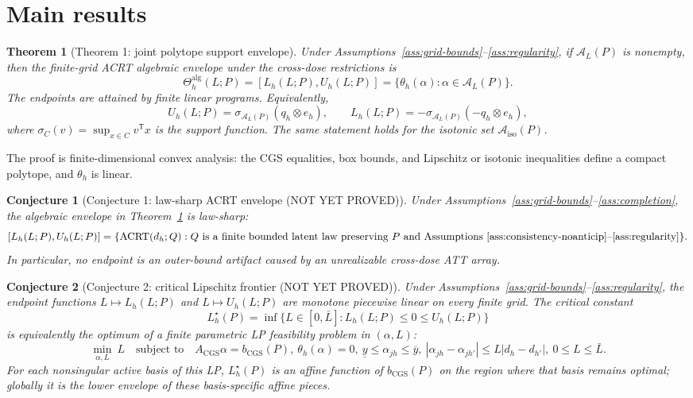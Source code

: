 \documentclass[11pt]{article}
\newcommand{\transpose}{\mathsf{T}}
\theoremstyle{definition}
\theoremstyle{plain}
\newtheorem{theorem}{Theorem}
\newtheorem{conjecture}{Conjecture}
\theoremstyle{remark}
\begin{document}
\section{Main results}
\begin{theorem}[Theorem 1: joint polytope support envelope]\label{thm:joint-envelope}
Under Assumptions~\ref{ass:grid-bounds}--\ref{ass:regularity}, if
\(\mathcal A_L(P)\) is nonempty, then the finite-grid ACRT algebraic envelope
under the cross-dose restrictions is
\[
  \Theta_h^{\mathrm{alg}}(L;P)=
  [L_h(L;P),U_h(L;P)]
  =
  \{\theta_h(\alpha):\alpha\in\mathcal A_L(P)\}.
\]
The endpoints are attained by finite linear programs.  Equivalently,
\[
  U_h(L;P)=\sigma_{\mathcal A_L(P)}(q_h\otimes e_h),
  \qquad
  L_h(L;P)=-\sigma_{\mathcal A_L(P)}(-q_h\otimes e_h),
\]
where \(\sigma_C(v)=\sup_{x\in C}v^\transpose x\) is the support function.
The same statement holds for the isotonic set
\(\mathcal A_{\mathrm{iso}}(P)\).
\end{theorem}
The proof is finite-dimensional convex analysis: the CGS equalities, box
bounds, and Lipschitz or isotonic inequalities define a compact polytope, and
\(\theta_h\) is linear.

\begin{conjecture}[Conjecture 1: law-sharp ACRT envelope (NOT YET PROVED)]\label{conj:law-sharp}
Under Assumptions~\ref{ass:grid-bounds}--\ref{ass:completion}, the algebraic
envelope in Theorem~\ref{thm:joint-envelope} is law-sharp:
\[
  [L_h(L;P),U_h(L;P)]
  =
  \{\operatorname{ACRT}(d_h;Q):Q \text{ is a finite bounded latent law
  preserving } P \text{ and Assumptions } \ref{ass:consistency-noanticip}
  \text{--}\ref{ass:regularity}\}.
\]
In particular, no endpoint is an outer-bound artifact caused by an
unrealizable cross-dose ATT array.
\end{conjecture}

\begin{conjecture}[Conjecture 2: critical Lipschitz frontier (NOT YET PROVED)]\label{conj:critical-l}
Under Assumptions~\ref{ass:grid-bounds}--\ref{ass:regularity}, the endpoint
functions \(L\mapsto L_h(L;P)\) and \(L\mapsto U_h(L;P)\) are monotone
piecewise linear on every finite grid.  The critical constant
\[
  L_h^\star(P)=\inf\{L\in[0,\bar L]:L_h(L;P)\le0\le U_h(L;P)\}
\]
is equivalently the optimum of a finite parametric LP feasibility problem in
\((\alpha,L)\):
\[
 \min_{\alpha,L}\ L
 \quad\text{subject to}\quad
 A_{\mathrm{CGS}}\alpha=b_{\mathrm{CGS}}(P),\ 
 \theta_h(\alpha)=0,\ 
 \underline y\le\alpha_{jh}\le\overline y,\ 
 |\alpha_{j h}-\alpha_{j h'}|\le L|d_h-d_{h'}|,\ 
 0\le L\le\bar L .
\]
For each nonsingular active basis of this LP, \(L_h^\star(P)\) is an affine
function of \(b_{\mathrm{CGS}}(P)\) on the region where that basis remains
optimal; globally it is the lower envelope of these basis-specific affine
pieces.
\end{conjecture}
\end{document}

